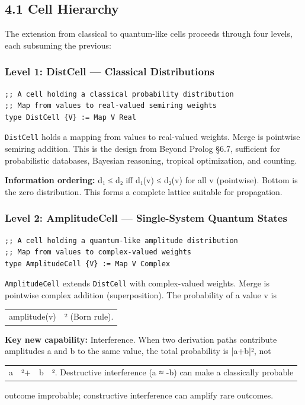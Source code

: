 \documentclass[11pt]{article}
\begin{document}
\subsection{4.1 Cell Hierarchy}
\label{sec:org594cd8d}

The extension from classical to quantum-like cells proceeds through four levels,
each subsuming the previous:
\subsubsection{Level 1: DistCell --- Classical Distributions}
\label{sec:orga468ce9}

\begin{verbatim}
;; A cell holding a classical probability distribution
;; Map from values to real-valued semiring weights
type DistCell {V} := Map V Real
\end{verbatim}

\texttt{DistCell} holds a mapping from values to real-valued weights. Merge is
pointwise semiring addition. This is the design from Beyond Prolog §6.7,
sufficient for probabilistic databases, Bayesian reasoning, tropical
optimization, and counting.

\textbf{Information ordering:} d₁ ≤ d₂ iff d₁(v) ≤ d₂(v) for all v (pointwise).
Bottom is the zero distribution. This forms a complete lattice suitable for
propagation.
\subsubsection{Level 2: AmplitudeCell --- Single-System Quantum States}
\label{sec:org3b0da11}

\begin{verbatim}
;; A cell holding a quantum-like amplitude distribution
;; Map from values to complex-valued weights
type AmplitudeCell {V} := Map V Complex
\end{verbatim}

\texttt{AmplitudeCell} extends \texttt{DistCell} with complex-valued weights. Merge is
pointwise complex addition (superposition). The probability of a value v is
\begin{center}
\begin{tabular}{ll}
amplitude(v) & ² (Born rule).\\
\end{tabular}
\end{center}

\textbf{Key new capability:} Interference. When two derivation paths contribute
amplitudes a and b to the same value, the total probability is |a+b|², not
\begin{center}
\begin{tabular}{llll}
a & ²+ & b & ². Destructive interference (a ≈ -b) can make a classically probable\\
\end{tabular}
\end{center}
outcome improbable; constructive interference can amplify rare outcomes.
\end{document}
